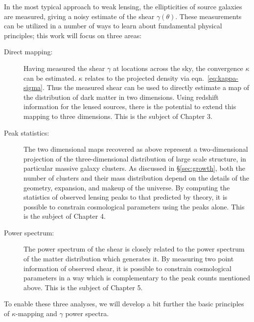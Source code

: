 In the most typical approach to weak lensing,
the ellipticities of source galaxies are measured, 
giving a noisy estimate of the shear $\gamma(\theta)$.
These measurements can be utilized in a number of ways to learn about
fundamental physical principles; this work will focus on three areas:
\begin{description}
  \item[Direct mapping:] Having measured the shear $\gamma$ at locations
    across the sky, the convergence $\kappa$ can be estimated.  $\kappa$
    relates to the projected density via eqn.~\ref{eq:kappa-sigma}.  Thus
    the measured shear can be used to directly estimate a map of the
    distribution of dark matter in two dimensions.  Using redshift
    information for the lensed sources, there is the potential to extend
    this mapping to three dimensions. This is the subject of Chapter 3.
  \item[Peak statistics:] The two dimensional maps recovered as above
    represent a two-dimensional projection of the three-dimensional
    distribution of large scale structure, in particular massive galaxy
    clusters.  As discussed in \S\ref{sec:growth}, both the number of
    clusters and their mass distribution depend on the details of the
    geometry, expansion, and makeup of the universe.  By computing the
    statistics of observed lensing peaks to 
    that predicted by theory, it is possible to
    constrain cosmological parameters using the peaks alone.  This is
    the subject of Chapter 4.
  \item[Power spectrum:] The power spectrum of the shear is closely related
    to the power spectrum of the matter distribution which generates it.
    By measuring two point information of observed shear, it is possible
    to constrain cosmological parameters in a way which is complementary
    to the peak counts mentioned above.  This is the subject of Chapter 5.
\end{description}

To enable these three analyses, we will develop a bit further the basic
principles of $\kappa$-mapping and $\gamma$ power spectra.

